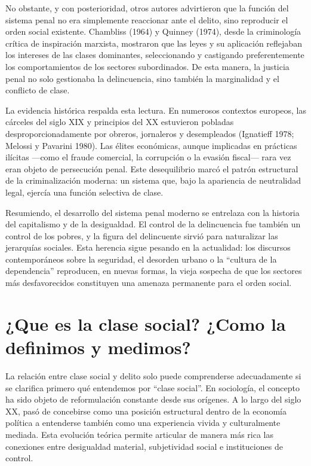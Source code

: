 \documentclass[
  spanish,
  letterpaper,
  DIV=11,
  numbers=noendperiod]{scrreprt}
\begin{document}
No obstante, y con posterioridad, otros autores advirtieron que la
función del sistema penal no era simplemente reaccionar ante el delito,
sino reproducir el orden social existente. Chambliss (1964) y Quinney
(1974), desde la criminología crítica de inspiración marxista, mostraron
que las leyes y su aplicación reflejaban los intereses de las clases
dominantes, seleccionando y castigando preferentemente los
comportamientos de los sectores subordinados. De esta manera, la
justicia penal no solo gestionaba la delincuencia, sino también la
marginalidad y el conflicto de clase.

La evidencia histórica respalda esta lectura. En numerosos contextos
europeos, las cárceles del siglo XIX y principios del XX estuvieron
pobladas desproporcionadamente por obreros, jornaleros y desempleados
(Ignatieff 1978; Melossi y Pavarini 1980). Las élites económicas, aunque
implicadas en prácticas ilícitas ---como el fraude comercial, la
corrupción o la evasión fiscal--- rara vez eran objeto de persecución
penal. Este desequilibrio marcó el patrón estructural de la
criminalización moderna: un sistema que, bajo la apariencia de
neutralidad legal, ejercía una función selectiva de clase.

Resumiendo, el desarrollo del sistema penal moderno se entrelaza con la
historia del capitalismo y de la desigualdad. El control de la
delincuencia fue también un control de los pobres, y la figura del
delincuente sirvió para naturalizar las jerarquías sociales. Esta
herencia sigue pesando en la actualidad: los discursos contemporáneos
sobre la seguridad, el desorden urbano o la ``cultura de la
dependencia'' reproducen, en nuevas formas, la vieja sospecha de que los
sectores más desfavorecidos constituyen una amenaza permanente para el
orden social.

\section{¿Que es la clase social? ¿Como la definimos y
medimos?}\label{que-es-la-clase-social-como-la-definimos-y-medimos}

La relación entre clase social y delito solo puede comprenderse
adecuadamente si se clarifica primero qué entendemos por ``clase
social''. En sociología, el concepto ha sido objeto de reformulación
constante desde sus orígenes. A lo largo del siglo XX, pasó de
concebirse como una posición estructural dentro de la economía política
a entenderse también como una experiencia vivida y culturalmente
mediada. Esta evolución teórica permite articular de manera más rica las
conexiones entre desigualdad material, subjetividad social e
instituciones de control.
\end{document}
